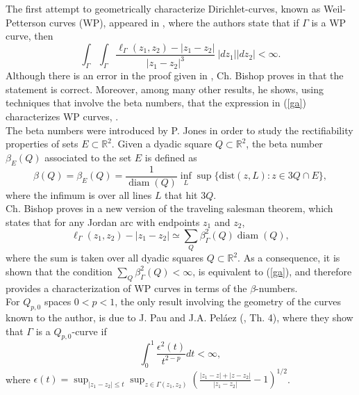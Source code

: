 \documentclass[12pt,a4paper]{article}
\theoremstyle{definition}
\theoremstyle{remark}
\newcommand{\diam}{\operatorname{diam}}
\numberwithin{komcounter}{section}
\begin{document}
The first attempt to geometrically  characterize  Dirichlet-curves, known as Weil-Petterson curves (WP), appeared in \cite{g}, where the authors state that if $\Gamma$ is a WP curve, then 
\begin{equation} \label{ga}
\int_{\Gamma} \int_{\Gamma} \frac{\ell_{\Gamma}(z_1,z_2)-|z_1-z_2|}{|z_1-z_2|^3}~ |dz_1||dz_2|< \infty.
\end{equation}
 Although there is an  error in the proof given in \cite{g},  Ch. Bishop  proves in  \cite{b} that  the  statement  is correct. Moreover, among many other results, he shows, using techniques that involve the beta numbers,  that the expression  in (\ref{ga})   characterizes WP curves, .\\
The beta numbers were introduced by P. Jones in order to study  the rectifiability properties of sets $E\subset \mathbb{R}^2$. Given a dyadic square $Q\subset \mathbb{R}^2$, the beta number $\beta_E(Q)$ associated to the set $E$ is defined as
$$
\beta(Q) = \beta_E(Q) =\frac{1}{\diam(Q)}\inf_L \sup\{\textrm{dist}(z, L) : z \in 3Q \cap E\},
$$
where the infimum is over all lines $L$ that hit $ 3Q.$\\
Ch. Bishop proves in \cite{b2}  a new version of the traveling salesman theorem, which states that for any Jordan arc with endpoints $z_1$ and $z_2$,
\begin{equation}\label{TSP}
\ell_{\Gamma}(z_1,z_2)-|z_1-z_2|\simeq \sum_{Q} \beta^2_\Gamma(Q) \diam(Q),
\end{equation}
where the sum is taken over all dyadic squares $Q\subset \mathbb{R}^2$. As a consequence, it is shown that the condition $\sum_{Q } \beta^2_\Gamma(Q) <\infty 
$,  is equivalent to (\ref{ga}), and therefore  provides a  characterization of  WP curves in terms of the $\beta$-numbers.\\
\indent
For $Q_{p,0}$ spaces $0<p<1$, the only result involving the geometry of the curves known to the author, is due to J. Pau and J.A. Pel\'aez  (\cite{PP}, Th. 4), where they show that  $\Gamma$ is a $Q_{p,0}$-curve if
$$
\int_0^1 \frac{\epsilon^2(t)}{t^{2-p}} dt< \infty,
	$$
	where $\epsilon(t)=\sup_{|z_1-z_2|\leq t} \sup_{z\in \Gamma(z_1,z_2)}  \left(\frac{|z_1-z|+|z-z_2|}{|z_1-z_2|}-1\right)^{1/2}$.
	
\end{document}
